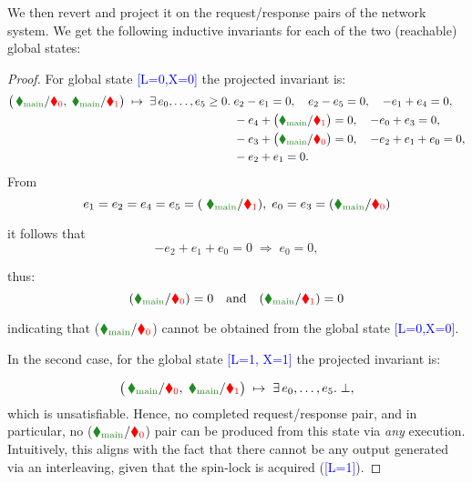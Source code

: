 We then revert and project it on the request/response pairs of the network system.
%
We get the following inductive invariants for each of the two (reachable) global states:

\begin{proof}
	
	\medskip\noindent
	For global state \textcolor{blue}{[L=0,X=0]} the projected invariant is:
	\[
	\bigl(\,\text{\color{ForestGreen}$\blacklozenge_{\text{main}}$}/\text{\color{red}$\blacklozenge_{0}$},\;
	\text{\color{ForestGreen}$\blacklozenge_{\text{main}}$}/\text{\color{red}$\blacklozenge_{1}$}\bigr)
	\;\mapsto\;
	\exists\,e_{0},\dots,e_{5}\ge0.\;
	\begin{aligned}[t]
		& e_{2}-e_{1}=0,\quad
		e_{2}-e_{5}=0,\quad
		-e_{1}+e_{4}=0,\\
		& -e_{4}+\bigl(\text{\color{ForestGreen}$\blacklozenge_{\text{main}}$}/\text{\color{red}$\blacklozenge_{1}$}\bigr)=0,\quad
		-e_{0}+e_{3}=0,\\
		& -e_{3}+\bigl(\text{\color{ForestGreen}$\blacklozenge_{\text{main}}$}/\text{\color{red}$\blacklozenge_{0}$}\bigr)=0,\quad
		-e_{2}+e_{1}+e_{0}=0,\\
		& -e_{2}+e_{1}=0.
	\end{aligned}
	\]
	\noindent From 
	\[e_{1}=e_{2}=e_{4}=e_{5}=(\;
	\text{\color{ForestGreen}$\blacklozenge_{\text{main}}$}/\text{\color{red}$\blacklozenge_{1}$}),\;
	e_{0}=e_{3}=
	(\text{\color{ForestGreen}$\blacklozenge_{\text{main}}$}/\text{\color{red}$\blacklozenge_{0}$})
	\]
	
	it follows that \[-e_{2}+e_{1}+e_{0}=0\;\Longrightarrow\;e_{0}=0,\]
	
	thus: 
	\[
	(	\text{\color{ForestGreen}$\blacklozenge_{\text{main}}$}/\text{\color{red}$\blacklozenge_{0}$})
	=0 \quad \text{and} \quad (	\text{\color{ForestGreen}$\blacklozenge_{\text{main}}$}/\text{\color{red}$\blacklozenge_{1}$})
	=0
	\]
	
	indicating that  (\(\text{\color{ForestGreen}$\blacklozenge_{\text{main}}$}/\text{\color{red}$\blacklozenge_{0}$}\)) cannot be obtained from the global state
	\textcolor{blue}{[L=0,X=0]}.
	
	\medskip\noindent
	In the second case, for the global state \textcolor{blue}{[L=1, X=1]}
	the projected invariant is:
	
	
	\[
	\bigl(\,\text{\color{ForestGreen}$\blacklozenge_{\text{main}}$}/\text{\color{red}$\blacklozenge_{0}$},\;
	\text{\color{ForestGreen}$\blacklozenge_{\text{main}}$}/\text{\color{red}$\blacklozenge_{1}$}\bigr)
	\;\mapsto\;
	\exists\,e_{0},\dots,e_{5}.\;\bot,
	\]
	which is unsatisfiable. Hence, no completed request/response pair, and in particular, no (\(\text{\color{ForestGreen}$\blacklozenge_{\text{main}}$}/\text{\color{red}$\blacklozenge_{0}$}\)) pair can be produced from this state via \textit{any} execution. Intuitively, this aligns with the fact that there cannot be any output generated via an interleaving, given that the spin-lock is acquired (\textcolor{blue}{[L=1]}).
	

\end{proof}
